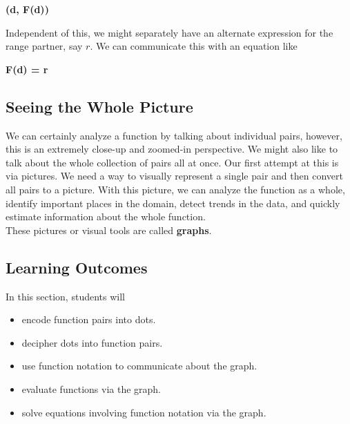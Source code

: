 \documentclass{ximera}
\begin{document}
\begin{center}
\textbf{\textcolor{purple!85!blue}{(d, F(d))}}
\end{center}




Independent of this, we might separately have an alternate expression for the range partner, say $r$.  We can communicate this with an equation like




\begin{center}
\textbf{\textcolor{purple!85!blue}{F(d) = r}}
\end{center}


\subsection{Seeing the Whole Picture}

We can certainly analyze a function by talking about individual pairs, however, this is an extremely close-up and zoomed-in perspective. We might also like to talk about the whole collection of pairs all at once.  Our first attempt at this is via pictures. We need a way to visually represent a single pair and then convert all pairs to a picture.  With this picture, we can analyze the function as a whole, identify important places in the domain, detect trends in the data, and quickly estimate information about the whole function. \\

These pictures or visual tools are called \textbf{\textcolor{blue!55!black}{graphs}}. \\






\subsection{Learning Outcomes}

\begin{sectionOutcomes}
In this section, students will 

\begin{itemize}
\item encode function pairs into dots.
\item decipher dots into function pairs.
\item use function notation to communicate about the graph.
\item evaluate functions via the graph.
\item solve equations involving function notation via the graph.
\end{itemize}
\end{sectionOutcomes}
\end{document}
